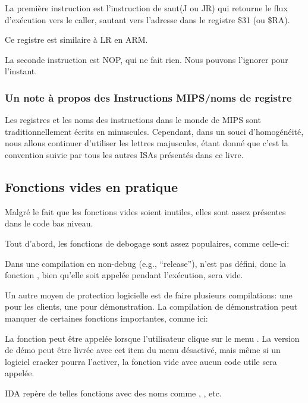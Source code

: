 

La première instruction est l'instruction de saut(J ou JR) qui retourne le flux d'exécution vers le \gls{caller},
sautant vers l'adresse dans le registre \$31 (ou \$RA).

Ce registre est similaire à \ac{LR} en ARM.

La seconde instruction est \ac{NOP}, qui ne fait rien.
Nous pouvons l'ignorer pour l'instant.

\subsubsection{Un note à propos des Instructions MIPS/noms de registre}

Les registres et les noms des instructions dans le monde de MIPS sont traditionnellement écrits en minuscules.
Cependant, dans un souci d'homogénéité, nous allons continuer d'utiliser les lettres majuscules,
étant donné que c'est la convention suivie par tous les autres \ac{ISA}s présentés dans ce livre.

\subsection{Fonctions vides en pratique}

Malgré le fait que les fonctions vides soient inutiles, elles sont assez présentes dans le code bas niveau.

Tout d'abord, les fonctions de debogage sont assez populaires, comme celle-ci:



Dans une compilation en non-debug (e.g., ``release''),  n'est pas défini,
donc la fonction , bien qu'elle soit appelée pendant l'exécution,
sera vide.

Un autre moyen de protection logicielle est de faire plusieurs compilations: une pour les clients, une pour démonstration.
La compilation de démonstration peut manquer de certaines fonctions importantes, comme ici:



La fonction  peut être appelée lorsque l'utilisateur clique sur le menu .
La version de démo peut être livrée avec cet item du menu désactivé, mais même si un logiciel cracker pourra l'activer,
la fonction vide avec aucun code utile sera appelée.

IDA repère de telles fonctions avec des noms comme , , etc.

